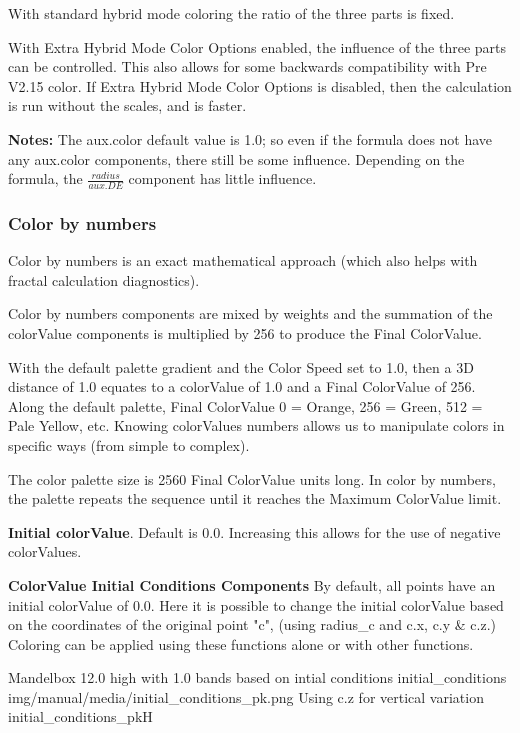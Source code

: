 With standard hybrid mode coloring the ratio of the three parts is fixed.

With Extra Hybrid Mode Color Options enabled, the influence of the three parts can be controlled. This also allows for some backwards compatibility with Pre V2.15 color. If Extra Hybrid Mode Color Options is disabled, then the calculation is run without the scales, and is faster.

\textbf{Notes: }The aux.color default value is 1.0; so even if the formula does not have any aux.color components, there still be some influence. Depending on the formula, the \(\frac{radius}{aux.DE}\) component has little influence.

\subsubsection{Color by numbers}\label{materials-color-by-numbers}

Color by numbers is an exact mathematical approach (which also helps with fractal calculation diagnostics).

Color by numbers components are mixed by weights and the summation of the colorValue components is multiplied by 256 to produce the Final ColorValue.

With the default palette gradient and the Color Speed set to 1.0, then a 3D distance of 1.0 equates to a colorValue of 1.0 and a Final ColorValue of 256. Along the default palette, Final ColorValue 0 = Orange, 256 = Green, 512 = Pale Yellow, etc.
Knowing colorValues numbers allows us to manipulate colors in specific ways (from simple to complex).

The color palette size is 2560 Final ColorValue units long. In color by numbers, the palette repeats the sequence until it reaches the Maximum ColorValue limit.

\textbf{Initial colorValue}. Default is 0.0. Increasing this allows for the use of negative colorValues.

\textbf{ColorValue Initial Conditions Components}
By default, all points have an initial colorValue of 0.0. Here it is possible to change the initial colorValue  based on the coordinates of the original point "c", (using radius\_c and c.x, c.y \& c.z.) Coloring can be applied using these functions alone or with other functions.

{Mandelbox 12.0 high with 1.0 bands based on intial conditions}
{initial_conditions}
{img/manual/media/initial_conditions_pk.png}
{Using c.z for vertical variation}
{initial_conditions_pk}{H}

